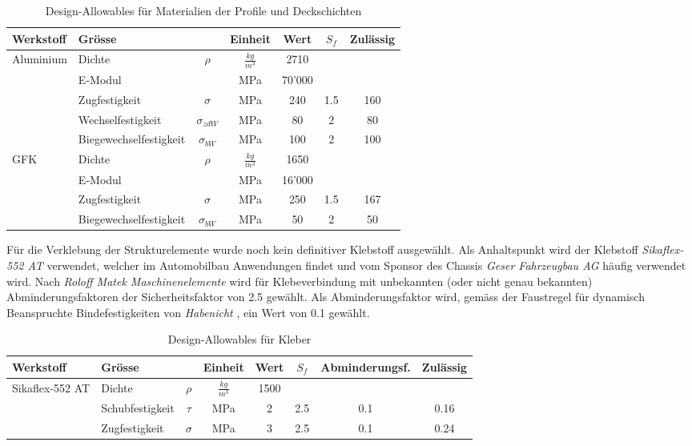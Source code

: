 \begin{table}[H]
  \centering
  \caption{Design-Allowables für Materialien der Profile und Deckschichten}
  \begin{tabular}{llccccc}	\hline
    Werkstoff	&	Grösse	&		&	Einheit	&	Wert	&	$S_f$	&	Zulässig\\	\hline
    \multirow{5}{*}{Aluminium\cite{alu1}}	&	Dichte	&	$\rho$        	&	$\frac{kg}{m^3}$	&	2710	&		&		\\
      &	E-Modul	&	              	&	MPa	&	70'000	&		&		\\
      &	Zugfestigkeit	&	$\sigma$      	&	MPa	&	240	&	1.5	&	160	\\
      &	Wechselfestigkeit	&	$\sigma_{zdW}$	&	MPa	&	80	&	2	&	80	\\
      &	Biegewechselfestigkeit	&	$\sigma_{bW}$ 	&	MPa	&	100	&	2	&	100	\\	\hline
    \multirow{4}{*}{GFK\footnotemark\cite{Roloff}}	&	Dichte	&	$\rho$        	&	$\frac{kg}{m^3}$	&	1650	&		&		\\
      &	E-Modul	&	              	&	MPa	&	16'000	&		&		\\
      &	Zugfestigkeit	&	$\sigma$      	&	MPa	&	250	&	1.5	&	167	\\
      &	Biegewechselfestigkeit	&	$\sigma_{bW}$ 	&	MPa	&	50	&	2	&	50	\\	\hline
  \end{tabular}
  \label{tab:Design-Allowables}
\end{table}


Für die Verklebung der Strukturelemente wurde noch kein definitiver Klebstoff ausgewählt. Als Anhaltspunkt wird der Klebstoff \emph{Sikaflex-552 AT} verwendet, welcher im Automobilbau Anwendungen findet und vom Sponsor des Chassis \emph{Geser Fahrzeugbau AG} häufig verwendet wird. Nach \emph{Roloff Matek Maschinenelemente} wird für Klebeverbindung mit unbekannten (oder nicht genau bekannten) Abminderungsfaktoren der Sicherheitsfaktor von 2.5 gewählt. Als Abminderungsfaktor wird, gemäss der Faustregel für dynamisch Beanspruchte Bindefestigkeiten von \emph{Habenicht} \cite{kleben1}, ein Wert von 0.1 gewählt.

\begin{table}[H]
  \centering
  \caption{Design-Allowables für Kleber}
  \begin{tabular}{llcccccc}	\hline
    Werkstoff	&	Grösse	&		&	Einheit	&	Wert	&	$S_f$	&	Abminderungsf.&	Zulässig	\\	\hline
    \multirow{3}{*}{Sikaflex-552 AT}	&	Dichte	&	$\rho$        	&	$\frac{kg}{m^3}$	&	1500	&		&		&		\\
      &	Schubfestigkeit	&	$\tau$	&	MPa	&	2	&	2.5	&	0.1	&	0.16	\\
      &	Zugfestigkeit	&	$\sigma$      	&	MPa	&	3	&	2.5	&	0.1	&	0.24	\\	\hline
  \end{tabular}
  \label{tab:Design-Allowables Kleben}
\end{table}

